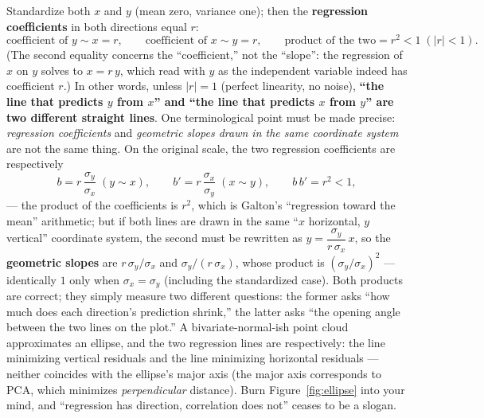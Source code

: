 Standardize both $x$ and $y$ (mean zero, variance one); then the \textbf{regression coefficients} in both directions equal $r$:
\[
  \text{coefficient of } y \sim x = r,
  \qquad
  \text{coefficient of } x \sim y = r,
  \qquad
  \text{product of the two} = r^2 < 1 \; (|r| < 1).
\]
(The second equality concerns the ``coefficient,'' not the ``slope'': the regression of $x$ on $y$ solves to $x = r\,y$, which read with $y$ as the independent variable indeed has coefficient $r$.) In other words, unless $|r| = 1$ (perfect linearity, no noise), \textbf{``the line that predicts $y$ from $x$'' and ``the line that predicts $x$ from $y$'' are two different straight lines}. One terminological point must be made precise: \textit{regression coefficients} and \textit{geometric slopes drawn in the same coordinate system} are not the same thing. On the original scale, the two regression coefficients are respectively
\[
  b = r\,\frac{\sigma_y}{\sigma_x} \;(y \sim x), \qquad
  b' = r\,\frac{\sigma_x}{\sigma_y} \;(x \sim y),
  \qquad b\, b' = r^2 < 1,
\]
--- the product of the coefficients is $r^2$, which is Galton's ``regression toward the mean'' arithmetic; but if both lines are drawn in the same ``$x$ horizontal, $y$ vertical'' coordinate system, the second must be rewritten as $y = \dfrac{\sigma_y}{r\,\sigma_x}\,x$, so the \textbf{geometric slopes} are $r\,\sigma_y/\sigma_x$ and $\sigma_y/(r\,\sigma_x)$, whose product is $(\sigma_y/\sigma_x)^2$ --- identically $1$ only when $\sigma_x = \sigma_y$ (including the standardized case). Both products are correct; they simply measure two different questions: the former asks ``how much does each direction's prediction shrink,'' the latter asks ``the opening angle between the two lines on the plot.'' A bivariate-normal-ish point cloud approximates an ellipse, and the two regression lines are respectively: the line minimizing vertical residuals and the line minimizing horizontal residuals --- neither coincides with the ellipse's major axis (the major axis corresponds to PCA, which minimizes \textit{perpendicular} distance). Burn Figure~\ref{fig:ellipse} into your mind, and ``regression has direction, correlation does not'' ceases to be a slogan.

